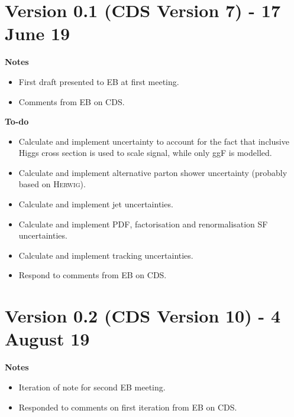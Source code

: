 \documentclass[NOTE, atlasdraft=true, texlive=2017, UKenglish]{\ATLASLATEXPATH atlasdoc}
\begin{document}
\maketitle


\clearpage

\section*{Version 0.1 (CDS Version 7) - 17 June 19}

\textbf{Notes}
\begin{itemize}
\item First draft presented to EB at first meeting.
\item Comments from EB on CDS.
\end{itemize}

\textbf{To-do}
\begin{itemize}
\item Calculate and implement uncertainty to account for the fact that inclusive Higgs cross section is used to scale signal, while only ggF is modelled.
\item Calculate and implement alternative parton shower uncertainty (probably based on \textsc{Herwig}).
\item Calculate and implement jet uncertainties.
\item Calculate and implement PDF, factorisation and renormalisation SF uncertainties.
\item Calculate and implement tracking uncertainties.
\item Respond to comments from EB on CDS.
\end{itemize}

\section*{Version 0.2 (CDS Version 10) - 4 August 19}

\textbf{Notes}
\begin{itemize}
\item Iteration of note for second EB meeting.
\item Responded to comments on first iteration from EB on CDS.
\end{itemize}
\end{document}
